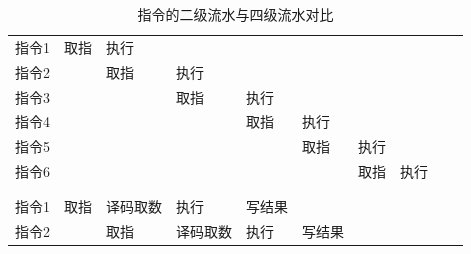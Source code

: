 \documentclass[UTF8]{report}
\newenvironment{solution}{{\noindent\hskip 2em \bf 解 \quad}}{}
\begin{document}
\begin{solution}
    \begin{table}[htbp]
        \centering
        \caption{指令的二级流水与四级流水对比}
        \begin{tabular}{lrrrrr|l|l|l|l|}
    \cline{2-3}    \multicolumn{1}{l|}{指令1} & \multicolumn{1}{l|}{取指} & \multicolumn{1}{l|}{执行} &   &   & \multicolumn{1}{r}{} & \multicolumn{1}{r}{} & \multicolumn{1}{r}{} & \multicolumn{1}{r}{} & \multicolumn{1}{r}{} \bigstrut\\
    \cline{2-4}    指令2 & \multicolumn{1}{r|}{} & \multicolumn{1}{l|}{取指} & \multicolumn{1}{l|}{执行} &   & \multicolumn{1}{r}{} & \multicolumn{1}{r}{} & \multicolumn{1}{r}{} & \multicolumn{1}{r}{} & \multicolumn{1}{r}{} \bigstrut\\
    \cline{3-5}    指令3 &   & \multicolumn{1}{r|}{} & \multicolumn{1}{l|}{取指} & \multicolumn{1}{l|}{执行} & \multicolumn{1}{r}{} & \multicolumn{1}{r}{} & \multicolumn{1}{r}{} & \multicolumn{1}{r}{} & \multicolumn{1}{r}{} \bigstrut\\
    \cline{4-6}    指令4 &   &   & \multicolumn{1}{r|}{} & \multicolumn{1}{l|}{取指} & \multicolumn{1}{l|}{执行} & \multicolumn{1}{r}{} & \multicolumn{1}{r}{} & \multicolumn{1}{r}{} & \multicolumn{1}{r}{} \bigstrut\\
    \cline{5-7}    指令5 &   &   &   & \multicolumn{1}{r|}{} & \multicolumn{1}{l|}{取指} & 执行 & \multicolumn{1}{r}{} & \multicolumn{1}{r}{} & \multicolumn{1}{r}{} \bigstrut\\
    \cline{6-8}    指令6 &   &   &   &   &   & 取指 & 执行 & \multicolumn{1}{r}{} & \multicolumn{1}{r}{} \bigstrut\\
    \cline{7-8}      &   &   &   &   & \multicolumn{1}{r}{} & \multicolumn{1}{r}{} & \multicolumn{1}{r}{} & \multicolumn{1}{r}{} & \multicolumn{1}{r}{} \bigstrut[t]\\
            &   &   &   &   & \multicolumn{1}{r}{} & \multicolumn{1}{r}{} & \multicolumn{1}{r}{} & \multicolumn{1}{r}{} & \multicolumn{1}{r}{} \bigstrut[b]\\
    \cline{2-5}    \multicolumn{1}{l|}{指令1} & \multicolumn{1}{l|}{取指} & \multicolumn{1}{l|}{译码取数} & \multicolumn{1}{l|}{执行} & \multicolumn{1}{l|}{写结果} & \multicolumn{1}{r}{} & \multicolumn{1}{r}{} & \multicolumn{1}{r}{} & \multicolumn{1}{r}{} & \multicolumn{1}{r}{} \bigstrut\\
    \cline{2-6}    指令2 & \multicolumn{1}{r|}{} & \multicolumn{1}{l|}{取指} & \multicolumn{1}{l|}{译码取数} & \multicolumn{1}{l|}{执行} & \multicolumn{1}{l|}{写结果} & \multicolumn{1}{r}{} & \multicolumn{1}{r}{} & \multicolumn{1}{r}{} & \multicolumn{1}{r}{} \bigstrut\\

\end{tabular}
\end{table}
\end{solution}
\end{document}
